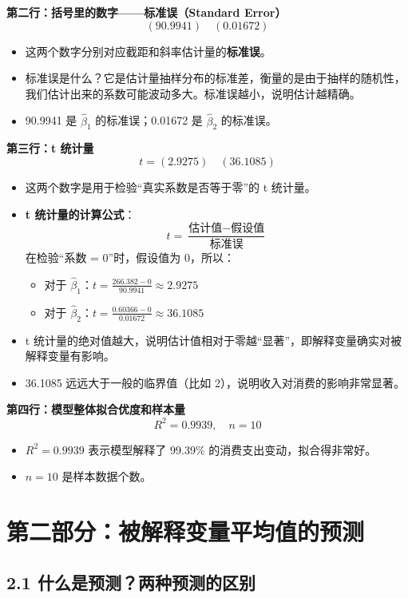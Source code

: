 \documentclass[12pt,a4paper]{article}
\begin{document}
\textbf{第二行：括号里的数字——标准误（Standard Error）}
\[
(90.9941) \quad (0.01672)
\]
\begin{itemize}
\item 这两个数字分别对应截距和斜率估计量的\textbf{标准误}。
\item 标准误是什么？它是估计量抽样分布的标准差，衡量的是由于抽样的随机性，我们估计出来的系数可能波动多大。标准误越小，说明估计越精确。
\item 90.9941 是 \(\hat{\beta}_1\) 的标准误；0.01672 是 \(\hat{\beta}_2\) 的标准误。
\end{itemize}

\textbf{第三行：t 统计量}
\[
t = (2.9275) \quad (36.1085)
\]
\begin{itemize}
\item 这两个数字是用于检验“真实系数是否等于零”的 t 统计量。
\item \textbf{t 统计量的计算公式}：
  \[
  t = \frac{\text{估计值} - \text{假设值}}{\text{标准误}}
  \]
  在检验“系数 = 0”时，假设值为 0，所以：
  \begin{itemize}
  \item 对于 \(\hat{\beta}_1\)：\(t = \frac{266.382 - 0}{90.9941} \approx 2.9275\)
  \item 对于 \(\hat{\beta}_2\)：\(t = \frac{0.60366 - 0}{0.01672} \approx 36.1085\)
  \end{itemize}
\item t 统计量的绝对值越大，说明估计值相对于零越“显著”，即解释变量确实对被解释变量有影响。
\item 36.1085 远远大于一般的临界值（比如 2），说明收入对消费的影响非常显著。
\end{itemize}

\textbf{第四行：模型整体拟合优度和样本量}
\[
R^2 = 0.9939, \quad n = 10
\]
\begin{itemize}
\item \(R^2 = 0.9939\) 表示模型解释了 99.39\% 的消费支出变动，拟合得非常好。
\item \(n=10\) 是样本数据个数。
\end{itemize}

\section*{第二部分：被解释变量平均值的预测}

\subsection*{2.1 什么是预测？两种预测的区别}
\end{document}
